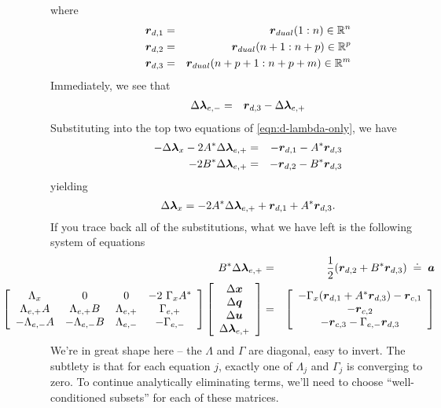 where 
\begin{eqnarray*} 
\boldsymbol{r}_{d,1} &=& \boldsymbol{r}_{dual}(1:n) \in \mathbb R^n \\
\boldsymbol{r}_{d,2} &=& \boldsymbol{r}_{dual}(n+1:n+p) \in \mathbb R^p \\
\boldsymbol{r}_{d,3} &=& \boldsymbol{r}_{dual}(n+p+1:n+p+m) \in \mathbb R^m \\
\end{eqnarray*} 
Immediately, we see that 
\begin{eqnarray}
\Delta \boldsymbol{\lambda}_{e,-} &=& \boldsymbol{r}_{d,3} - \Delta \boldsymbol{\lambda}_{e,+}
\end{eqnarray}
Substituting into the top two equations of \eqref{eqn:d-lambda-only}, we have
\begin{eqnarray}
-\Delta \boldsymbol{\lambda}_{x} - 2 A^* \Delta \boldsymbol{\lambda}_{e,+} &=& - \boldsymbol{r}_{d,1} - A^* \boldsymbol{r}_{d,3} \\
-2 B^* \Delta \boldsymbol{\lambda}_{e,+} &=& -\boldsymbol{r}_{d,2} - B^* \boldsymbol{r}_{d,3}
\end{eqnarray}
yielding
\begin{equation}
\Delta \boldsymbol{\lambda}_{x} = -2 A^* \Delta \boldsymbol{\lambda}_{e,+} +  \boldsymbol{r}_{d,1} + A^* \boldsymbol{r}_{d,3} .
\end{equation}
If you trace back all of the substitutions, what we have left is the following system of equations
\begin{eqnarray*}
B^* \Delta \llambda_{e,+} &=& \frac{1}{2} ( \r_{d,2} + B^* \r_{d,3} ) \;\doteq\; \a \\
\hspace{-.75in}\left[ \begin{array}{cccc} \Lambda_{x} & 0 & 0 & -2 \ \Gamma_{x} A^* \\ \Lambda_{e,+}A & \Lambda_{e,+} B & \Lambda_{e,+} & \Gamma_{e,+} \\ 
-\Lambda_{e,-} A& -\Lambda_{e,-} B & \Lambda_{e,-} & -\Gamma_{e,-} \end{array} \right] \left[ \begin{array}{c} \Delta \x \\ \Delta \q \\ \Delta \u \\ \Delta \llambda_{e,+} \end{array} \right] &=& \left[ \begin{array}{c} -\Gamma_{x} (\r_{d,1} + A^*\r_{d,3}) -\r_{c,1} \\ -\r_{c,2} \\ -\r_{c,3}-\Gamma_{e,-} \r_{d,3} \end{array} \right]
\end{eqnarray*}
We're in great shape here -- the $\Lambda$ and $\Gamma$ are diagonal, easy to invert. The subtlety is that for each equation $j$, exactly one of $\Lambda_j$ and $\Gamma_j$ is converging to zero. To continue analytically eliminating terms, we'll need to choose ``well-conditioned subsets'' for each of these matrices. 

